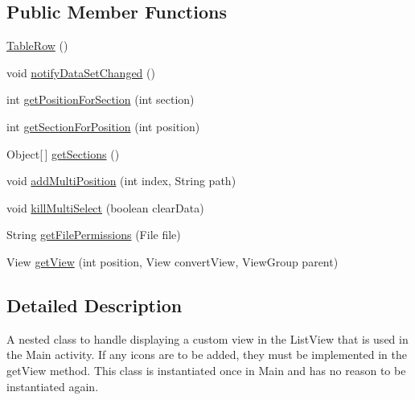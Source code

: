\subsection*{Public Member Functions}
\begin{DoxyCompactItemize}
\item 
\hyperlink{classcom_1_1zia_1_1freshdocs_1_1widget_1_1fileexplorer_1_1_event_handler_1_1_table_row_ac5b9f66aac2291022e8dbd52d4d2fa74}{Table\-Row} ()
\item 
void \hyperlink{classcom_1_1zia_1_1freshdocs_1_1widget_1_1fileexplorer_1_1_event_handler_1_1_table_row_ac70a714870fc657181b82e5b8a393bee}{notify\-Data\-Set\-Changed} ()
\item 
int \hyperlink{classcom_1_1zia_1_1freshdocs_1_1widget_1_1fileexplorer_1_1_event_handler_1_1_table_row_a71356918d8cd09f58196fb45081e474e}{get\-Position\-For\-Section} (int section)
\item 
int \hyperlink{classcom_1_1zia_1_1freshdocs_1_1widget_1_1fileexplorer_1_1_event_handler_1_1_table_row_a9567d70b78693e6521e62e629d198162}{get\-Section\-For\-Position} (int position)
\item 
Object\mbox{[}$\,$\mbox{]} \hyperlink{classcom_1_1zia_1_1freshdocs_1_1widget_1_1fileexplorer_1_1_event_handler_1_1_table_row_ab4bf7b2e919b0734db4f98a9b425049a}{get\-Sections} ()
\item 
void \hyperlink{classcom_1_1zia_1_1freshdocs_1_1widget_1_1fileexplorer_1_1_event_handler_1_1_table_row_acb58cd152f4f2f1b16386368afffddd3}{add\-Multi\-Position} (int index, String path)
\item 
void \hyperlink{classcom_1_1zia_1_1freshdocs_1_1widget_1_1fileexplorer_1_1_event_handler_1_1_table_row_a0fe663833bfc00760d95c377f21d9b83}{kill\-Multi\-Select} (boolean clear\-Data)
\item 
String \hyperlink{classcom_1_1zia_1_1freshdocs_1_1widget_1_1fileexplorer_1_1_event_handler_1_1_table_row_a1cdb749d3c9987729f7f664f438cf076}{get\-File\-Permissions} (File file)
\item 
View \hyperlink{classcom_1_1zia_1_1freshdocs_1_1widget_1_1fileexplorer_1_1_event_handler_1_1_table_row_aa70e25518435be383e1870ecc93ee827}{get\-View} (int position, View convert\-View, View\-Group parent)
\end{DoxyCompactItemize}


\subsection{Detailed Description}
A nested class to handle displaying a custom view in the List\-View that is used in the Main activity. If any icons are to be added, they must be implemented in the get\-View method. This class is instantiated once in Main and has no reason to be instantiated again. 

